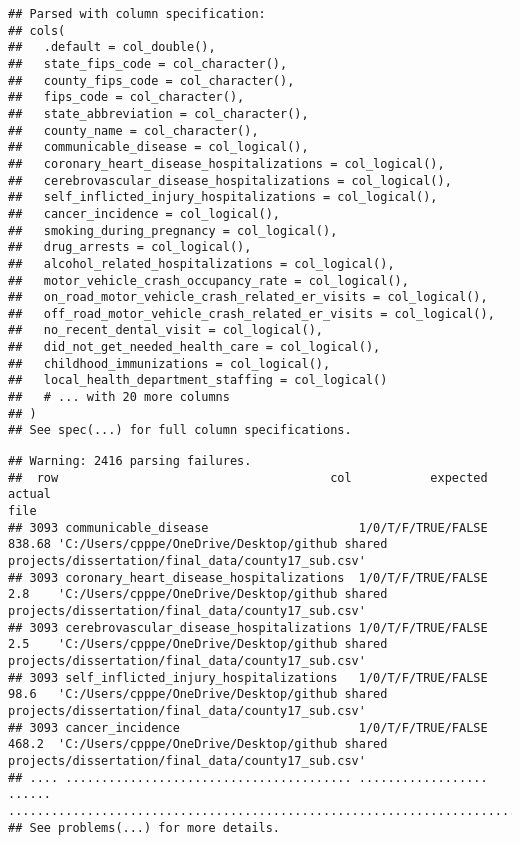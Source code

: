 \documentclass[
]{article}
\begin{document}
\begin{verbatim}
## Parsed with column specification:
## cols(
##   .default = col_double(),
##   state_fips_code = col_character(),
##   county_fips_code = col_character(),
##   fips_code = col_character(),
##   state_abbreviation = col_character(),
##   county_name = col_character(),
##   communicable_disease = col_logical(),
##   coronary_heart_disease_hospitalizations = col_logical(),
##   cerebrovascular_disease_hospitalizations = col_logical(),
##   self_inflicted_injury_hospitalizations = col_logical(),
##   cancer_incidence = col_logical(),
##   smoking_during_pregnancy = col_logical(),
##   drug_arrests = col_logical(),
##   alcohol_related_hospitalizations = col_logical(),
##   motor_vehicle_crash_occupancy_rate = col_logical(),
##   on_road_motor_vehicle_crash_related_er_visits = col_logical(),
##   off_road_motor_vehicle_crash_related_er_visits = col_logical(),
##   no_recent_dental_visit = col_logical(),
##   did_not_get_needed_health_care = col_logical(),
##   childhood_immunizations = col_logical(),
##   local_health_department_staffing = col_logical()
##   # ... with 20 more columns
## )
## See spec(...) for full column specifications.
\end{verbatim}

\begin{verbatim}
## Warning: 2416 parsing failures.
##  row                                      col           expected actual                                                                                              file
## 3093 communicable_disease                     1/0/T/F/TRUE/FALSE 838.68 'C:/Users/cpppe/OneDrive/Desktop/github shared projects/dissertation/final_data/county17_sub.csv'
## 3093 coronary_heart_disease_hospitalizations  1/0/T/F/TRUE/FALSE 2.8    'C:/Users/cpppe/OneDrive/Desktop/github shared projects/dissertation/final_data/county17_sub.csv'
## 3093 cerebrovascular_disease_hospitalizations 1/0/T/F/TRUE/FALSE 2.5    'C:/Users/cpppe/OneDrive/Desktop/github shared projects/dissertation/final_data/county17_sub.csv'
## 3093 self_inflicted_injury_hospitalizations   1/0/T/F/TRUE/FALSE 98.6   'C:/Users/cpppe/OneDrive/Desktop/github shared projects/dissertation/final_data/county17_sub.csv'
## 3093 cancer_incidence                         1/0/T/F/TRUE/FALSE 468.2  'C:/Users/cpppe/OneDrive/Desktop/github shared projects/dissertation/final_data/county17_sub.csv'
## .... ........................................ .................. ...... .................................................................................................
## See problems(...) for more details.
\end{verbatim}
\end{document}
